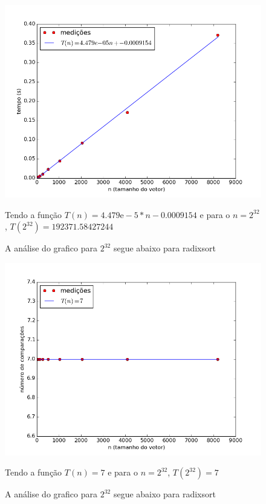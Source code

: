 \documentclass[12pt,a4paper,twoside]{report}
\begin{document}


\begin{figure}[ht]
\centering \includegraphics[scale=0.8]{../radixsort/imagens/radixsortQuaseCresc500.png}
\caption{A análise do grafico para $2^{32}$ segue abaixo para radixsort}

Tendo a função $T(n) = 4.479\mathrm{e}-5*n-0.0009154$ e para o $n =2^{32}$, $T(2^{32}) = 192371.58427244$
\label{fig:radixsortQuaseCresc500}
\end{figure}

\begin{figure}[ht]
\centering \includegraphics[scale=0.8]{../radixsort/imagens/radixsortQuaseCresc501.png}
\caption{A análise do grafico para $2^{32}$ segue abaixo para radixsort}

Tendo a função $T(n) = 7$ e para o $n =2^{32}$, $T(2^{32}) = 7$
\label{fig:radixsortQuaseCresc501}
\end{figure}
\end{document}
